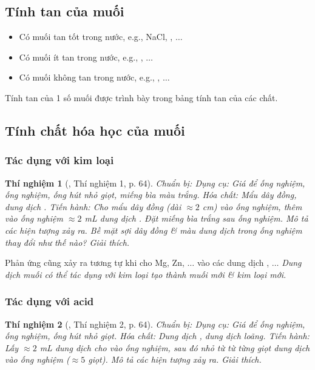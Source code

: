 \documentclass{article}
\newtheorem{thinghiem}{Thí nghiệm}
\begin{document}
\subsection{Tính tan của muối}
\begin{itemize}
	\item Có muối tan tốt trong nước, e.g., NaCl, , $\ldots$
	\item Có muối ít tan trong nước, e.g., , $\ldots$
	\item Có muối không tan trong nước, e.g., , $\ldots$
\end{itemize}
Tính tan của 1 số muối được trình bày trong bảng tính tan của các chất.

\subsection{Tính chất hóa học của muối}

\subsubsection{Tác dụng với kim loại}

\begin{thinghiem}[\cite{SGK_KHTN_8_Canh_Dieu}, Thí nghiệm 1, p. 64]
	{\rm Chuẩn bị:} Dụng cụ: Giá để ống nghiệm, ống nghiệm, ống hút nhỏ giọt, miếng bìa màu trắng. Hóa chất: Mẩu dây đồng, dung dịch {\rm{}}. {\rm Tiến hành:} Cho mẩu dây đồng (dài $\approx2$ {\rm cm}) vào ống nghiệm, thêm vào ống nghiệm $\approx2$ {\rm mL} dung dịch {\rm{}}. Đặt miếng bìa trắng sau ống nghiệm. Mô tả các hiện tượng xảy ra. Bề mặt sợi dây đồng \& màu dung dịch trong ống nghiệm thay đổi như thế nào? Giải thích.
\end{thinghiem}
Phản ứng cũng xảy ra tương tự khi cho Mg, Zn, $\ldots$ vào các dung dịch , $\ldots$ \textit{Dung dịch muối có thể tác dụng với kim loại tạo thành muối mới \& kim loại mới}.

\subsubsection{Tác dụng với acid}

\begin{thinghiem}[\cite{SGK_KHTN_8_Canh_Dieu}, Thí nghiệm 2, p. 64]
	{\rm Chuẩn bị:} Dụng cụ: Giá để ống nghiệm, ống nghiệm, ống hút nhỏ giọt. Hóa chất: Dung dịch {\rm{}}, dung dịch {\rm{}} loãng. {\rm Tiến hành:} Lấy $\approx2$ {\rm mL} dung dịch {\rm{}} cho vào ống nghiệm, sau đó nhỏ từ từ từng giọt dung dịch {\rm{}} vào ống nghiệm ($\approx5$ giọt). Mô tả các hiện tượng xảy ra. Giải thích.
\end{thinghiem}
\end{document}
